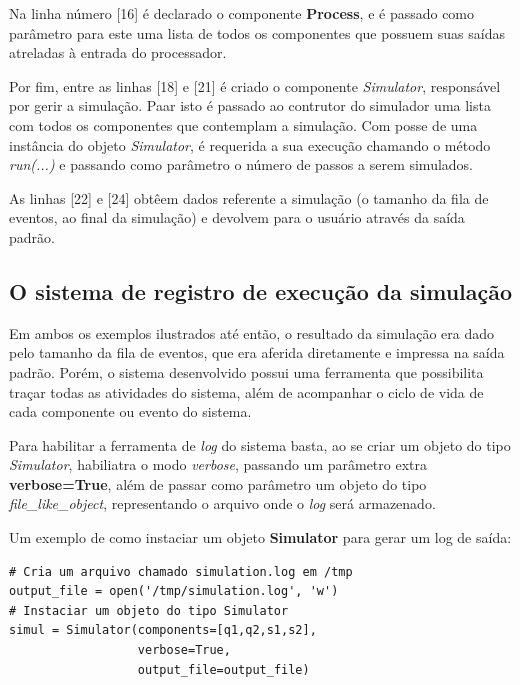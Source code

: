 Na linha número [16] é declarado o componente \textbf{Process}, e é passado como parâmetro para este uma lista de todos os componentes que possuem suas saídas atreladas à entrada do processador.

Por fim, entre as linhas [18] e [21] é criado o componente \textit{Simulator}, responsável por gerir a simulação. Paar isto é passado ao contrutor do simulador uma lista com todos os componentes que contemplam a simulação. Com posse de uma instância do objeto \textit{Simulator}, é requerida a sua execução chamando o método \textit{run(...)}  e passando como parâmetro o número de passos a serem simulados.

As linhas [22] e [24] obtêem dados referente a simulação (o tamanho da fila de eventos, ao final da simulação) e devolvem para o usuário através da saída padrão.



\subsection{O sistema de registro de execução da simulação}

Em ambos os exemplos ilustrados até então, o resultado da simulação era dado pelo tamanho da fila de eventos, que era aferida diretamente e impressa na saída padrão. Porém, o sistema desenvolvido possui uma ferramenta que possibilita traçar todas as atividades do sistema, além de acompanhar o ciclo de vida de cada componente ou evento do sistema.

Para habilitar a ferramenta de \textit{log} do sistema basta, ao se criar um objeto do tipo \textit{Simulator}, habiliatra o modo \textit{verbose}, passando um parâmetro extra \textbf{verbose=True}, além de passar como parâmetro um objeto do tipo \textit{file\_like\_object}, representando o arquivo onde o \textit{log} será armazenado.

Um exemplo de como instaciar um objeto \textbf{Simulator} para gerar um log de saída:

\begin{lstlisting}
# Cria um arquivo chamado simulation.log em /tmp
output_file = open('/tmp/simulation.log', 'w')
# Instaciar um objeto do tipo Simulator
simul = Simulator(components=[q1,q2,s1,s2], 
	              verbose=True, 
	              output_file=output_file)
\end{lstlisting}

